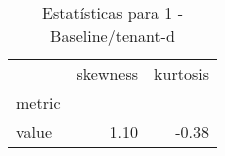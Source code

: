 \begin{table}[htbp]
\caption{Estatísticas para 1 - Baseline/tenant-d}
\label{tab:1_-_baseline_tenant-d_skewkurt}
\begin{tabular}{lrr}
\toprule
 & skewness & kurtosis \\
metric &  &  \\
\midrule
value & 1.10 & -0.38 \\
\bottomrule
\end{tabular}
\end{table}
